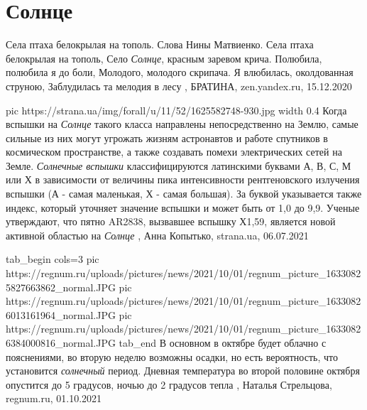  
 
 
 
 
\chapter{Солнце}
\label{sec:slova.solnce}

Села птаха белокрылая на тополь. Слова Нины Матвиенко. Села птаха белокрылая на
тополь, Село \emph{Солнце}, красным заревом крича. Полюбила, полюбила я до
боли, Молодого, молодого скрипача. Я влюбилась, околдованная струною,
Заблудилась та мелодия в лесу
, 
БРАТИНА, zen.yandex.ru, 15.12.2020

\ifcmt
  pic https://strana.ua/img/forall/u/11/52/1625582748-930.jpg
	width 0.4
\fi
Когда вспышки на \emph{Солнце} такого класса направлены непосредственно на Землю,
самые сильные из них могут угрожать жизням астронавтов и работе спутников в
космическом пространстве, а также создавать помехи электрических сетей на
Земле.  \emph{Солнечные вспышки} классифицируются латинскими буквами А, В, С, М или Х
в зависимости от величины пика интенсивности рентгеновского излучения вспышки
(А - самая маленькая, Х - самая большая). За буквой указывается также индекс,
который уточняет значение вспышки и может быть от 1,0 до 9,9.  Ученые
утверждают, что пятно AR2838, вызвавшее вспышку Х1,59, является новой активной
областью на \emph{Солнце}
, 
Анна Копытько, strana.ua, 06.07.2021


\ifcmt
  tab_begin cols=3
     pic https://regnum.ru/uploads/pictures/news/2021/10/01/regnum_picture_16330825827663862_normal.JPG
     pic https://regnum.ru/uploads/pictures/news/2021/10/01/regnum_picture_16330826013161964_normal.JPG
		 pic https://regnum.ru/uploads/pictures/news/2021/10/01/regnum_picture_16330826384000816_normal.JPG
  tab_end
\fi
В основном в октябре будет облачно с пояснениями, во вторую неделю возможны
осадки, но есть вероятность, что установится \emph{солнечный} период. Дневная
температура во второй половине октября опустится до 5 градусов, ночью до 2
градусов тепла
, 
Наталья Стрельцова, regnum.ru, 01.10.2021


